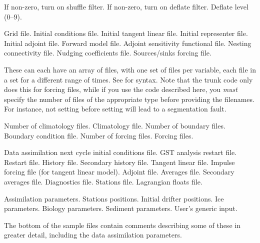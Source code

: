 \begin{klist}
     \begin{klist}
           If non-zero, turn on shuffle filter.
           If non-zero, turn on deflate filter.
           Deflate level (0--9).
     \end{klist}
    \mbox{}
     \begin{klist}
         Grid file.
         Initial conditions file.
         Initial tangent linear file.
         Initial representer file.
         Initial adjoint file.
         Forward model file.
         Adjoint sensitivity functional file.
         Nesting connectivity file.
         Nudging coefficients file.
         Sources/sinks forcing file.
     \end{klist}
     These can
each have an array of files, with one set of files per variable,
each file in a set for a different range of times. See 
for syntax. Note that the trunk code only does this for forcing
files, while if you use the code described here, you {\em must}
specify the number of files of the appropriate type before providing
the filenames. For instance, not setting  before setting
 will lead to a segmentation fault.
     \begin{klist}
         Number of climatology files.
         Climatology file.
         Number of boundary files.
         Boundary condition file.
         Number of forcing files.
         Forcing files.
     \end{klist}
     \mbox{}
     \begin{klist}
         Data assimilation next cycle initial conditions
     file.
         GST analysis restart file.
         Restart file.
         History file.
         Secondary history file.
         Tangent linear file.
         Impulse forcing file (for tangent linear model).
         Adjoint file.
         Averages file.
        Secondary averages file.
         Diagnostics file.
         Stations file.
         Lagrangian floats file.
     \end{klist}
    \mbox{}
     \begin{klist}
         Assimilation parameters.
         Stations positions.
         Initial drifter positions.
         Ice parameters.
         Biology parameters.
         Sediment parameters.
         User's generic input.
     \end{klist}
\end{klist}
The bottom of the sample files contain comments describing some of these in
greater detail, including the data assimilation parameters.

